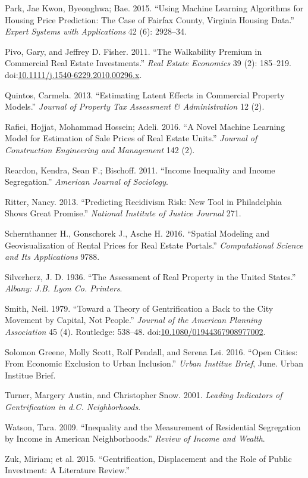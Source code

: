 \documentclass[]{article}
\begin{document}
\hypertarget{ref-Park2015}{}
Park, Jae Kwon, Byeonghwa; Bae. 2015. ``Using Machine Learning
Algorithms for Housing Price Prediction: The Case of Fairfax County,
Virginia Housing Data.'' \emph{Expert Systems with Applications} 42 (6):
2928--34.

\hypertarget{ref-Pivo2011}{}
Pivo, Gary, and Jeffrey D. Fisher. 2011. ``The Walkability Premium in
Commercial Real Estate Investments.'' \emph{Real Estate Economics} 39
(2): 185--219.
doi:\href{https://doi.org/10.1111/j.1540-6229.2010.00296.x}{10.1111/j.1540-6229.2010.00296.x}.

\hypertarget{ref-Quintos2013}{}
Quintos, Carmela. 2013. ``Estimating Latent Effects in Commercial
Property Models.'' \emph{Journal of Property Tax Assessment \&
Administration} 12 (2).

\hypertarget{ref-Rafiei2016}{}
Rafiei, Hojjat, Mohammad Hossein; Adeli. 2016. ``A Novel Machine
Learning Model for Estimation of Sale Prices of Real Estate Units.''
\emph{Journal of Construction Engineering and Management} 142 (2).

\hypertarget{ref-Reardon2011}{}
Reardon, Kendra, Sean F.; Bischoff. 2011. ``Income Inequality and Income
Segregation.'' \emph{American Journal of Sociology}.

\hypertarget{ref-Ritter2013}{}
Ritter, Nancy. 2013. ``Predicting Recidivism Risk: New Tool in
Philadelphia Shows Great Promise.'' \emph{National Institute of Justice
Journal} 271.

\hypertarget{ref-Schernthanner2016}{}
Schernthanner H., Gonschorek J., Asche H. 2016. ``Spatial Modeling and
Geovisualization of Rental Prices for Real Estate Portals.''
\emph{Computational Science and Its Applications} 9788.

\hypertarget{ref-Silverherz1936}{}
Silverherz, J. D. 1936. ``The Assessment of Real Property in the United
States.'' \emph{Albany: J.B. Lyon Co. Printers}.

\hypertarget{ref-Smith1979}{}
Smith, Neil. 1979. ``Toward a Theory of Gentrification a Back to the
City Movement by Capital, Not People.'' \emph{Journal of the American
Planning Association} 45 (4). Routledge: 538--48.
doi:\href{https://doi.org/10.1080/01944367908977002}{10.1080/01944367908977002}.

\hypertarget{ref-urban2016}{}
Solomon Greene, Molly Scott, Rolf Pendall, and Serena Lei. 2016. ``Open
Cities: From Economic Exclusion to Urban Inclusion.'' \emph{Urban
Institue Brief}, June. Urban Institue Brief.

\hypertarget{ref-Turner2001}{}
Turner, Margery Austin, and Christopher Snow. 2001. \emph{Leading
Indicators of Gentrification in d.C. Neighborhoods}.

\hypertarget{ref-Watson2009}{}
Watson, Tara. 2009. ``Inequality and the Measurement of Residential
Segregation by Income in American Neighborhoods.'' \emph{Review of
Income and Wealth}.

\hypertarget{ref-Zuk2015}{}
Zuk, Miriam; et al. 2015. ``Gentrification, Displacement and the Role of
Public Investment: A Literature Review.''
\end{document}
